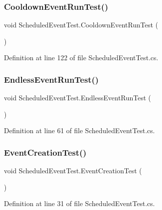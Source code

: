 \subsubsection{\texorpdfstring{Cooldown\+Event\+Run\+Test()}{CooldownEventRunTest()}}
{\footnotesize\ttfamily void Scheduled\+Event\+Test.\+Cooldown\+Event\+Run\+Test (\begin{DoxyParamCaption}{ }\end{DoxyParamCaption})}



Definition at line 122 of file Scheduled\+Event\+Test.\+cs.

\mbox{\label{class_scheduled_event_test_aa732768471b5daf96ad4965b0ac08294}} 
\subsubsection{\texorpdfstring{Endless\+Event\+Run\+Test()}{EndlessEventRunTest()}}
{\footnotesize\ttfamily void Scheduled\+Event\+Test.\+Endless\+Event\+Run\+Test (\begin{DoxyParamCaption}{ }\end{DoxyParamCaption})}



Definition at line 61 of file Scheduled\+Event\+Test.\+cs.

\mbox{\label{class_scheduled_event_test_a4560717049248abe6386df6bf4e26aa6}} 
\subsubsection{\texorpdfstring{Event\+Creation\+Test()}{EventCreationTest()}}
{\footnotesize\ttfamily void Scheduled\+Event\+Test.\+Event\+Creation\+Test (\begin{DoxyParamCaption}{ }\end{DoxyParamCaption})}



Definition at line 31 of file Scheduled\+Event\+Test.\+cs.

